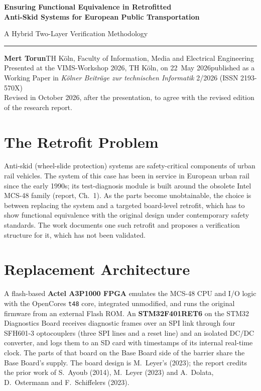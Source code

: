 \documentclass[a4paper,10pt]{article}
\newcommand{\dotsep}{\;\textcolor{inkgray}{\textbullet}\;}
\begin{document}
{\color{ieeeblue}\bfseries\LARGE Ensuring Functional Equivalence in Retrofitted\\[0.2ex]
Anti-Skid Systems for European Public Transportation\par}
\vspace{0.5ex}
{\large\color{inkgray} A Hybrid Two-Layer Verification Methodology\par}
\vspace{0.7ex}
{\color{ieeeblue}\rule{\linewidth}{1.1pt}}
\vspace{0.5ex}

\textbf{Mert Torun}\dotsep TH K\"oln, Faculty of Information, Media and Electrical Engineering\\
Presented at the VIMS-Workshop 2026, TH K\"oln, on 22~May 2026\dotsep published as a Working Paper in \emph{K\"olner Beitr\"age zur technischen Informatik} 2/2026 (ISSN 2193-570X)\\
{\footnotesize\color{inkgray}Revised in October 2026, after the presentation, to agree with the revised edition of the research report.}

\section{The Retrofit Problem}
Anti-skid (wheel-slide protection) systems are safety-critical components of urban rail vehicles. The system of this case has been in service in European urban rail since the early 1990s; its test-diagnosis module is built around the obsolete Intel MCS-48 family (report, Ch.~1). As the parts become unobtainable, the choice is between replacing the system and a targeted board-level retrofit, which has to show functional equivalence with the original design under contemporary safety standards. The work documents one such retrofit and proposes a verification structure for it, which has not been validated.

\section{Replacement Architecture}
A flash-based \textbf{Actel A3P1000 FPGA} emulates the MCS-48 CPU and I/O logic with the OpenCores \texttt{t48} core, integrated unmodified, and runs the original firmware from an external Flash ROM. An \textbf{STM32F401RET6} on the STM32 Diagnostics Board receives diagnostic frames over an SPI link through four SFH601-3 optocouplers (three SPI lines and a reset line) and an isolated DC/DC converter, and logs them to an SD card with timestamps of its internal real-time clock. The parts of that board on the Base Board side of the barrier share the Base Board's supply. The board design is M.~Leyer's (2023); the report credits the prior work of S.~Ayoub (2014), M.~Leyer (2023) and A.~Dolata, D.~Ostermann and F.~Schiffelers (2023).
\end{document}
